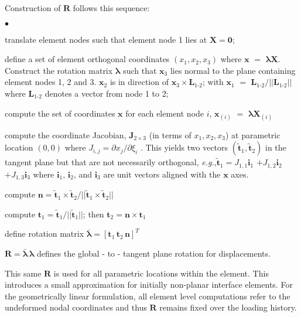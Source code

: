 \documentclass[11pt]{report}
\numberwithin{equation}{section}
\newcommand{\bmf } {\boldsymbol }  %
\newcommand{\eg}{\emph{e.g.},\xspace}
\newcommand{\NI}{\noindent}
\newcommand{\squishlist}{
 \begin{list}{$\bullet$}
  { \setlength{\itemsep}{0pt}
     \setlength{\parsep}{3pt}
     \setlength{\topsep}{3pt}
     \setlength{\partopsep}{0pt}
     \setlength{\leftmargin}{1.5em}
     \setlength{\labelwidth}{1em}
     \setlength{\labelsep}{0.5em} } }
\newcommand{\squishend}{
  \end{list}  }
\begin{document}
\NI Construction of $\bmf{R}$ follows this sequence:
\squishlist
\item  translate element nodes such that
element node 1 lies at $\bmf{X}=\bmf{0}$;
\item define a set of element orthogonal coordinates $( x_1, x_2,  x_3)$
where $\bmf{x} $ $=$ $  \bmf{\lambda} \bmf{X}$.
Construct the rotation matrix $  \bmf{\lambda} $
such that $\bmf{x}_3$ lies normal to the plane containing element nodes 1, 2 and 3.
$\bmf{x}_2$ is in direction of $\bmf{x}_3 \times \bmf{L}_{1\mbox{-}2}$; with 
$\bmf{x}_1$ $=$ $\bmf{L}_{1\mbox{-}2}/ || \bmf{L}_{1\mbox{-}2} ||$ where
$\bmf{L}_{1\mbox{-}2}$ denotes a vector from node 1 to 2;
\item compute the set of coordinates $\bmf{x}$ for each element node $i$, 
$\bmf{ x}_{(i)}$ $=$ $ \bmf{\lambda}  \bmf{X}_{(i)}$
\item  compute
the coordinate Jacobian, $ \bmf {J}_{2\times 3}$  (in terms of  $ x_1, x_2, x_3$)
at parametric location $(0,0)$ where $J_{i,j}= \partial x_j / \partial \xi_i$ .
This yields two vectors $(\tilde {\bmf{t}}_1,
\tilde {\bmf{t}}_2)$ in the
tangent plane but that are not necessarily orthogonal, \eg $\tilde {\bmf{t}}_1=J_{1,1} \bmf{i}_1 $
$+J_{1,2} \bmf{i}_2$ $+J_{1,3} \bmf{i}_3$ where $\bmf{i}_1$, $\bmf{i}_2$, and $\bmf{i}_3$
are unit vectors aligned with the $\bmf{x}$ axes.
\item compute $\bmf{n} = \tilde{\bmf{t}}_1 \times \tilde{\bmf{t}}_2 / || \tilde{\bmf{t}}_1 \times \tilde{\bmf{t}}_2 ||$
\item compute $\bmf{t}_1 = \tilde {\bmf{t}}_1 / ||\tilde {\bmf{t}}_1 ||$; then $\bmf{t}_2 =
\bmf{n} \times \bmf{t}_1 $
\item define rotation matrix $ \bar { \bmf \lambda } = 
\left [ \bmf{t}_1 \, \bmf{t}_2 \, \bmf{n} \right ]^T $ 
\item $ \bmf{R} =  \bar { \bmf \lambda } \, \bmf{\lambda}$
defines the global - to - tangent plane rotation for displacements.
\squishend
 
\NI  This same $\bmf{R}$ is
used for all parametric locations within the element. This introduces a small
approximation for initially non-planar interface elements. For the geometrically 
linear formulation, all element level computations refer to the undeformed nodal
coordinates and thus $\bmf{R}$ remains fixed over the loading history.
\end{document}
